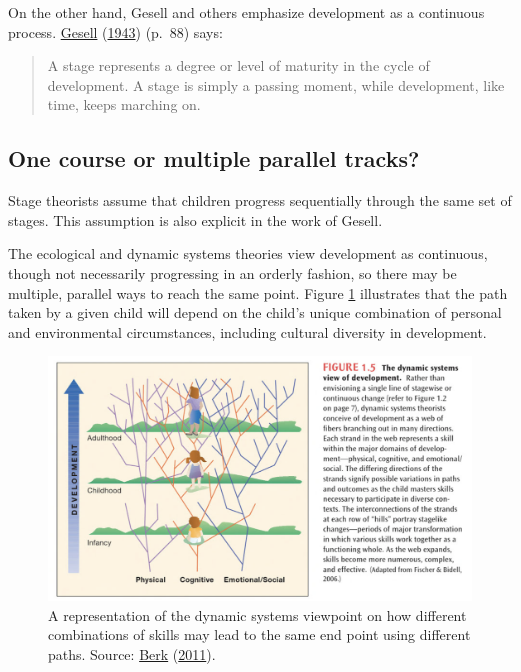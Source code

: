 \documentclass[
]{book}
\begin{document}
On the other hand, Gesell and others emphasize development as a continuous process. \protect\hyperlink{ref-gesell1943}{Gesell} (\protect\hyperlink{ref-gesell1943}{1943}) (p.~88) says:

\begin{quote}
A stage represents a degree or level of maturity in the cycle of development. A stage is simply a passing moment, while development, like time, keeps marching on.
\end{quote}

\hypertarget{one-course-or-multiple-parallel-tracks}{%
\subsection{One course or multiple parallel tracks?}\label{one-course-or-multiple-parallel-tracks}}

Stage theorists assume that children progress sequentially through the same set of stages. This assumption is also explicit in the work of Gesell.

The ecological and dynamic systems theories view development as continuous, though not necessarily progressing in an orderly fashion, so there may be multiple, parallel ways to reach the same point. Figure \ref{fig:dynamic} illustrates that the path taken by a given child will depend on the child's unique combination of personal and environmental circumstances, including cultural diversity in development.

\begin{figure}

{\centering \includegraphics[width=1\linewidth]{fig/dynamic} 

}

\caption{A representation of the dynamic systems viewpoint on how different combinations of skills may lead to the same end point using different paths. Source: \protect\hyperlink{ref-berk2013}{Berk} (\protect\hyperlink{ref-berk2013}{2011}).}\label{fig:dynamic}
\end{figure}
\end{document}
